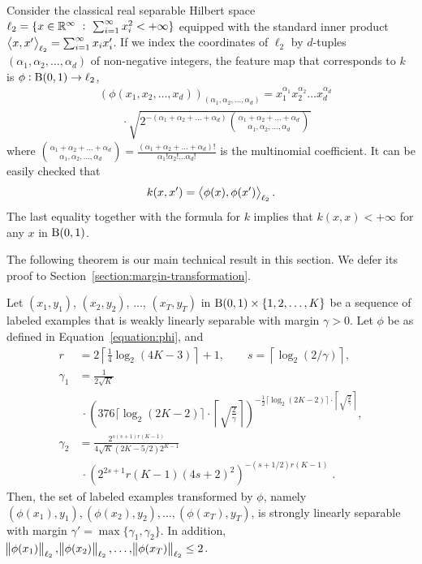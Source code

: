 Consider the classical real separable Hilbert space $\ell_2 = \{ x \in \mathbb{R}^\infty
~:~ \sum_{i=1}^\infty x_i^2 < + \infty \}$ equipped with the standard inner
product $\left\langle x, x' \right\rangle_{\ell_2} = \sum_{i=1}^\infty x_i x'_i$. If we index the
coordinates of $\ell_2$ by $d$-tuples $(\alpha_1, \alpha_2, \dots, \alpha_d)$ of
non-negative integers, the feature map that corresponds to $k$ is $\phi: \operatorname{B}(0,1)
\to \ell_2$,
\begin{align}
& \left(\phi(x_1, x_2, \dots, x_d)\right)_{(\alpha_1, \alpha_2, \dots, \alpha_d)} = x_1^{\alpha_1} x_2^{\alpha_2} \dots x_d^{\alpha_d} \nonumber \\
& \qquad \cdot \sqrt{2^{-(\alpha_1 + \alpha_2 + \dots + \alpha_d)} \binom{\alpha_1 + \alpha_2 + \dots + \alpha_d}{\alpha_1, \alpha_2, \dots, \alpha_d}}
\label{equation:phi}
\end{align}
where $\binom{\alpha_1 + \alpha_2 + \dots + \alpha_d}{\alpha_1, \alpha_2, \dots,
\alpha_d} = \frac{(\alpha_1 + \alpha_2 + \dots + \alpha_d)!}{\alpha_1! \alpha_2!
\dots \alpha_d!}$ is the multinomial coefficient. It can be easily checked that
$$
k(x,x') = \left\langle \phi(x), \phi(x') \right\rangle_{\ell_2}.
$$
The last equality together with the formula for $k$ implies that $k(x,x) <
+\infty$ for any $x$ in $\operatorname{B}(0,1)$.

The following theorem is our main technical result in this section. We defer its
proof to Section~\ref{section:margin-transformation}.

\begin{theorem}
\label{theorem:margin-transformation}
Let $(x_1, y_1)$, $(x_2, y_2)$, $\dots$, $(x_T, y_T)$ in $\operatorname{B}(0,1) \times
\{1,2,\dots,K\}$ be a sequence of labeled examples that is weakly linearly
separable with margin $\gamma > 0$. Let $\phi$ be as defined in
Equation~\eqref{equation:phi}, and
\begingroup
\allowdisplaybreaks
\begin{align*}
r & = 2 \left\lceil \frac{1}{4} \log_2(4K-3) \right\rceil + 1, \quad \quad s = \left \lceil \log_2(2/\gamma) \right \rceil, \\
\gamma_1 & = \frac{1}{2\sqrt{K}}  \\
& \ \cdot \left(376 \lceil \log_2(2K-2) \rceil \cdot \left \lceil \sqrt{\frac{2}{\gamma}} \right \rceil \right)^{-\frac{1}{2} \lceil \log_2(2K-2) \rceil \cdot \left \lceil \sqrt{\frac{2}{\gamma}} \right \rceil}, \\
\gamma_2 & = \frac{2^{s(s+1)r(K-1)} }{4\sqrt{K}(2K-5/2) 2^{K-1}} \\
& \ \cdot \left(2^{2s+1} r(K-1) (4s+2)^2 \right)^{-(s+1/2)r(K-1)} \; .
\end{align*}
\endgroup
Then, the set of labeled examples transformed by $\phi$,
namely $(\phi(x_1), y_1), (\phi(x_2), y_2), \dots,
(\phi(x_T), y_T)$, is strongly linearly separable with margin $\gamma' =
\max\{\gamma_1, \gamma_2\}$. In addition, $\norm{\phi(x_1)}_{\ell_2},
\norm{\phi(x_2)}_{\ell_2}, \dots, \norm{\phi(x_T)}_{\ell_2} \le 2$.
\end{theorem}

